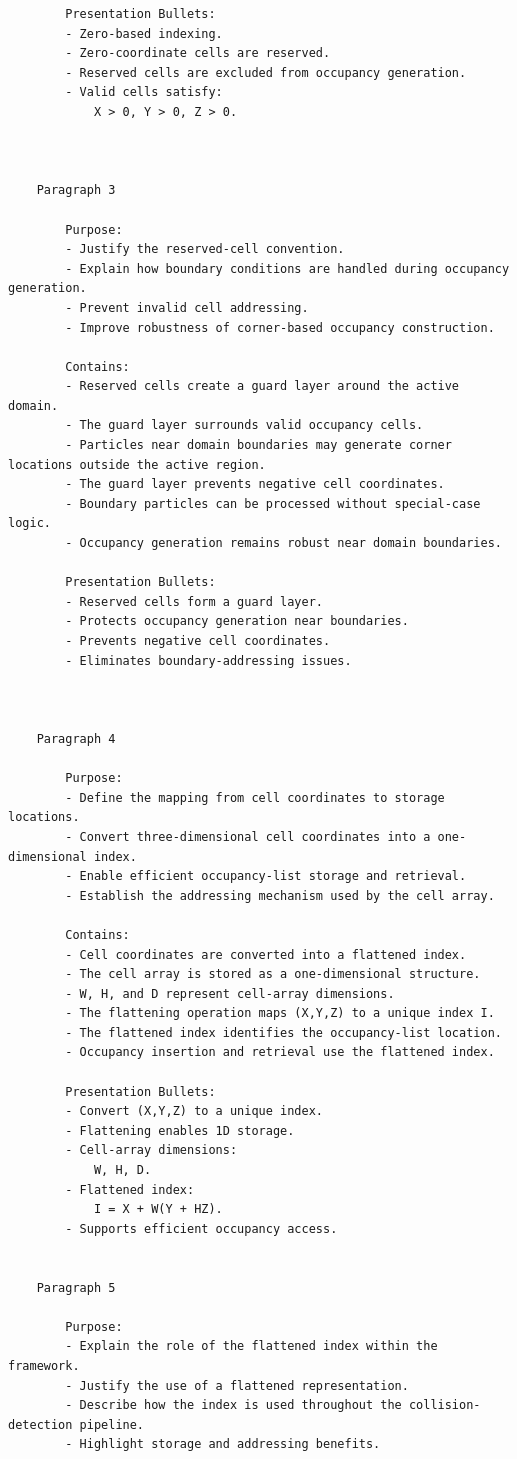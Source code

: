 \begin{verbatim}
		Presentation Bullets:
		- Zero-based indexing.
		- Zero-coordinate cells are reserved.
		- Reserved cells are excluded from occupancy generation.
		- Valid cells satisfy:
			X > 0, Y > 0, Z > 0.



	Paragraph 3

		Purpose:
		- Justify the reserved-cell convention.
		- Explain how boundary conditions are handled during occupancy generation.
		- Prevent invalid cell addressing.
		- Improve robustness of corner-based occupancy construction.

		Contains:
		- Reserved cells create a guard layer around the active domain.
		- The guard layer surrounds valid occupancy cells.
		- Particles near domain boundaries may generate corner locations outside the active region.
		- The guard layer prevents negative cell coordinates.
		- Boundary particles can be processed without special-case logic.
		- Occupancy generation remains robust near domain boundaries.

		Presentation Bullets:
		- Reserved cells form a guard layer.
		- Protects occupancy generation near boundaries.
		- Prevents negative cell coordinates.
		- Eliminates boundary-addressing issues.



	Paragraph 4

		Purpose:
		- Define the mapping from cell coordinates to storage locations.
		- Convert three-dimensional cell coordinates into a one-dimensional index.
		- Enable efficient occupancy-list storage and retrieval.
		- Establish the addressing mechanism used by the cell array.

		Contains:
		- Cell coordinates are converted into a flattened index.
		- The cell array is stored as a one-dimensional structure.
		- W, H, and D represent cell-array dimensions.
		- The flattening operation maps (X,Y,Z) to a unique index I.
		- The flattened index identifies the occupancy-list location.
		- Occupancy insertion and retrieval use the flattened index.

		Presentation Bullets:
		- Convert (X,Y,Z) to a unique index.
		- Flattening enables 1D storage.
		- Cell-array dimensions:
			W, H, D.
		- Flattened index:
			I = X + W(Y + HZ).
		- Supports efficient occupancy access.


	Paragraph 5

		Purpose:
		- Explain the role of the flattened index within the framework.
		- Justify the use of a flattened representation.
		- Describe how the index is used throughout the collision-detection pipeline.
		- Highlight storage and addressing benefits.


\end{verbatim}
